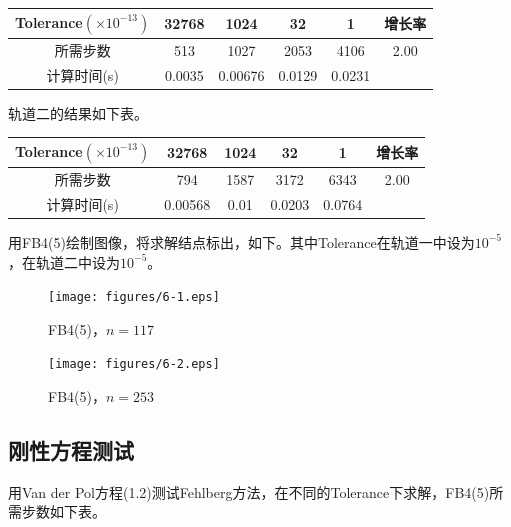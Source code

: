 \documentclass[lang=cn,10pt,bibend=bibtex]{elegantbook}
\begin{document}
\vspace{-1em}
\begin{table}[H]
  \centering
  \begin{tabular}{c|cccc|c}
    Tolerance$(\times 10^{-13})$ & 32768 & 1024 & 32 & 1 & 增长率 \\ \hline
    所需步数 & 513 & 1027 & 2053 & 4106 & 2.00   \\
    计算时间(s) & 0.0035 & 0.00676  & 0.0129  & 0.0231 & 
  \end{tabular}
\end{table}
\vspace{-1em}

轨道二的结果如下表。

\vspace{-1em}
\begin{table}[H]
  \centering
  \begin{tabular}{c|cccc|c}
    Tolerance$(\times 10^{-13})$ & 32768 & 1024 & 32 & 1 & 增长率 \\ \hline
    所需步数 & 794 & 1587 & 3172 & 6343 & 2.00   \\
    计算时间(s) & 0.00568 & 0.01  & 0.0203  & 0.0764 & 
  \end{tabular}
\end{table}
\vspace{-1em}

用FB4(5)绘制图像，将求解结点标出，如下。其中Tolerance在轨道一中设为$10^{-5}$，在轨道二中设为$10^{-5}$。

\vspace{-.7em}
\begin{figure}[H]
  \centering
  \begin{minipage}[t]{0.34\linewidth}
      \centering
      \texttt{[image: figures/6-1.eps]}
      \caption*{\small FB4(5)，$n=117$}
  \end{minipage}
  \hspace{1em}
  \begin{minipage}[t]{0.34\linewidth}
      \centering
      \texttt{[image: figures/6-2.eps]}
      \caption*{\small FB4(5)，$n=253$}
  \end{minipage}
\end{figure}

\subsection{刚性方程测试}

用Van der Pol方程(1.2)测试Fehlberg方法，在不同的Tolerance下求解，FB4(5)所需步数如下表。
\end{document}
